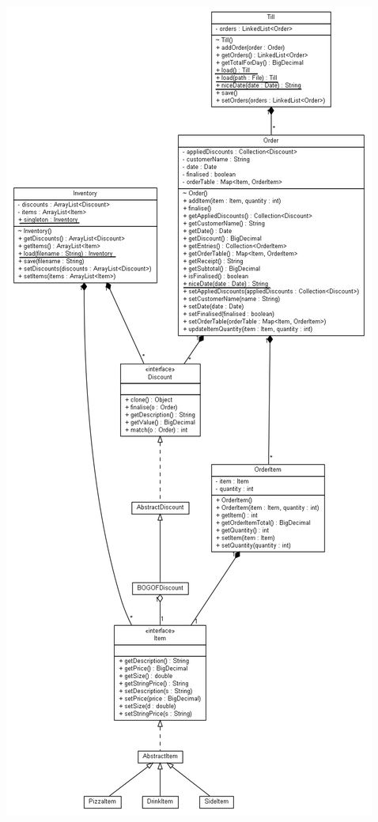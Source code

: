 \documentclass[11pt]{article} %
\begin{document}
\includegraphics[scale=0.35]{classdiagram.png}
\end{document}
